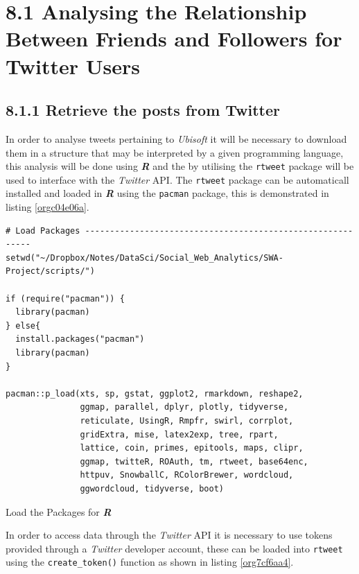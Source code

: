 \documentclass[11pt]{article}
\begin{document}
\section{8.1 Analysing the Relationship Between Friends and Followers for Twitter Users}
\label{sec:orgb251a0f}
\subsection{8.1.1 Retrieve the posts from Twitter}
\label{sec:org3ca921f}
In order to analyse tweets pertaining to \emph{Ubisoft} it will be necessary to
download them in a structure that may be interpreted by a given programming
language, this analysis will be done using \textbf{\emph{R}} and the by utilising the \texttt{rtweet} package will be used to interface with the \emph{Twitter} API. The \texttt{rtweet} package can be automaticall installed and loaded in \textbf{\emph{R}} using the \texttt{pacman} package, this is demonstrated in listing \ref{orgc04e06a}.

\begin{listing}[htbp]
\begin{verbatim}
# Load Packages -----------------------------------------------------------
setwd("~/Dropbox/Notes/DataSci/Social_Web_Analytics/SWA-Project/scripts/")

if (require("pacman")) {
  library(pacman)
} else{
  install.packages("pacman")
  library(pacman)
}

pacman::p_load(xts, sp, gstat, ggplot2, rmarkdown, reshape2,
               ggmap, parallel, dplyr, plotly, tidyverse,
               reticulate, UsingR, Rmpfr, swirl, corrplot,
               gridExtra, mise, latex2exp, tree, rpart,
               lattice, coin, primes, epitools, maps, clipr,
               ggmap, twitteR, ROAuth, tm, rtweet, base64enc,
               httpuv, SnowballC, RColorBrewer, wordcloud,
               ggwordcloud, tidyverse, boot)
\end{verbatim}
\caption{\label{orgc04e06a}Load the Packages for \textbf{\textbf{\emph{R}}}}
\end{listing}


In order to access data through the \emph{Twitter} API it is necessary to use tokens provided through a \emph{Twitter} developer account, these can be loaded into \texttt{rtweet} using the \texttt{create\_token()} function as shown in listing \ref{org7cf6aa4}.
\end{document}
